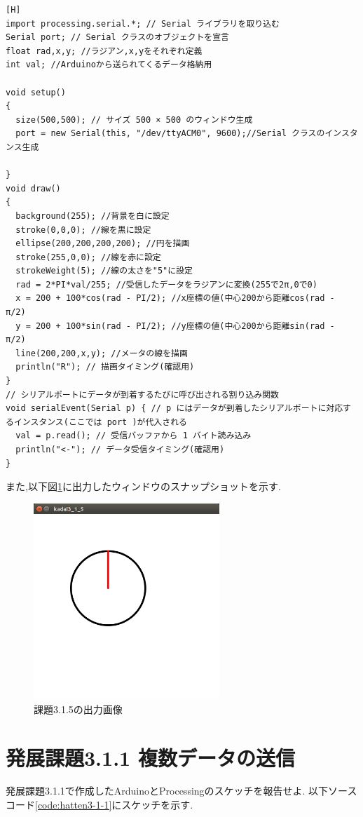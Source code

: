 \documentclass{jarticle}
\begin{document}
\begin{lstlisting}[caption = 課題3.1.5,label=code:kadai3-1-5][H]
import processing.serial.*; // Serial ライブラリを取り込む
Serial port; // Serial クラスのオブジェクトを宣言
float rad,x,y; //ラジアン,x,yをそれぞれ定義
int val; //Arduinoから送られてくるデータ格納用

void setup()
{
  size(500,500); // サイズ 500 × 500 のウィンドウ生成
  port = new Serial(this, "/dev/ttyACM0", 9600);//Serial クラスのインスタンス生成

}
void draw()
{
  background(255); //背景を白に設定
  stroke(0,0,0); //線を黒に設定
  ellipse(200,200,200,200); //円を描画
  stroke(255,0,0); //線を赤に設定
  strokeWeight(5); //線の太さを"5"に設定
  rad = 2*PI*val/255; //受信したデータをラジアンに変換(255で2π,0で0)
  x = 200 + 100*cos(rad - PI/2); //x座標の値(中心200から距離cos(rad - π/2)
  y = 200 + 100*sin(rad - PI/2); //y座標の値(中心200から距離sin(rad - π/2)
  line(200,200,x,y); //メータの線を描画
  println("R"); // 描画タイミング(確認用)
}
// シリアルポートにデータが到着するたびに呼び出される割り込み関数
void serialEvent(Serial p) { // p にはデータが到着したシリアルポートに対応するインスタンス(ここでは port )が代入される
  val = p.read(); // 受信バッファから 1 バイト読み込み
  println("<-"); // データ受信タイミング(確認用)
}
\end{lstlisting}
また,以下図\ref{fig:kadai3-1-5}に出力したウィンドウのスナップショットを示す.

\begin{figure}[H]
\begin{center}
\includegraphics[width=7.0cm]{images/kadai3-1-5.png}
\caption{課題3.1.5の出力画像}
\label{fig:kadai3-1-5}
\end{center}
\end{figure}


\section{発展課題3.1.1 複数データの送信}
発展課題3.1.1で作成したArduinoとProcessingのスケッチを報告せよ.
以下ソースコード\ref{code:hatten3-1-1}にスケッチを示す.
\end{document}
